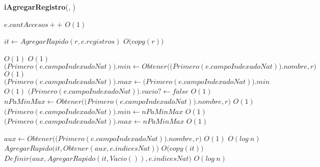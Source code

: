 \begin{Algoritmos}
\begin{algorithm}[H]{\textbf{iAgregarRegistro}(, )}
  \begin{algorithmic}
    \State $e.cantAccesos++$                                          \Comment $O(1)$
    

    \State $it \gets AgregarRapido(r, e.registros)$                   \Comment $O\big(copy(r)\big)$
    \State $ $

                                \Comment $O(1)$
                              \Comment $O(1)$
        \State $\big(Primero(e.campoIndexadoNat)\big).min \gets Obtener\big(\big(Primero(e.campoIndexadoNat)\big).nombre, r\big)$                       \Comment $O(1)$
        \State $\big(Primero(e.campoIndexadoNat)\big).max \gets \big(Primero(e.campoIndexadoNat)\big).min$                                   \Comment $O(1)$
        \State $\big(Primero(e.campoIndexadoNat)\big).vacio? \gets false$ \Comment $O(1)$ 
      \Else
        \State $nPaMinMax \gets Obtener\big(\big(Primero(e.campoIndexadoNat)\big).nombre, r\big)$                                                       \Comment $O(1)$
          \State $\big(Primero(e.campoIndexadoNat)\big).min \gets nPaMinMax$
                                                                      \Comment $O(1)$
        \EndIf
          \State $\big(Primero(e.campoIndexadoNat)\big).max \gets nPaMinMax$
                                                                      \Comment $O(1)$
        \EndIf
      \EndIf

      \State $aux \gets Obtener\big(\big(Primero(e.campoIndexadoNat)\big).nombre, r\big)$                                                                \Comment $O(1)$
                                        \Comment $O(log\ n)$
        \State $AgregarRapido\big(it, Obtener(aux, e.indicesNat)\big)$ \Comment $O\big(copy(it)\big)$
      \Else
        \State $Definir\big(aux, AgregarRapido(it, Vacio()), e.indicesNat\big)$                                                              \Comment $O(log\ n)$
      \EndIf
    \EndIf
    \State $ $


\end{algorithmic}
\end{algorithm}
\end{Algoritmos}
